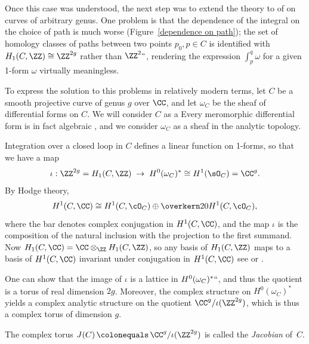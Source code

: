 Once this case was understood, the next step was to extend the theory
to
%
of 
%
on curves of arbitrary
genus. One problem is that the dependence of the integral on the
choice of path is much worse 
(Figure~\ref{dependence on path});
the set of homology classes of paths
between two points $p_0, p \in C$ is identified with $H_1(C,\ZZ) \cong
\ZZ^{2g}$ rather than $\ZZ^2` `$, rendering the expression $\int_p^q
\omega$ for a given 1-form $\omega$ virtually meaningless. 
{\meshing\par}

To express the solution to this problems in relatively modern terms,
let $C$ be a smooth projective curve of genus $g$ over $\CC$, and let
$\omega_{C}$ be the sheaf of differential forms on $C$. We will
consider $C$ as a 
%
%
Every meromorphic differential form is in fact algebraic
\cite{SerreGAGA}, and we consider $\omega_{C}$ as a sheaf in the analytic topology.

Integration 
%
over a closed loop in $C$ defines a linear function on 1-forms, so that we have a map
$$
\iota: \ZZ^{2g} = H_1(C,\ZZ) \; \to \;  H^0(\omega_C)^* \cong H^1(\sO_C) = \CC^{g}.
$$
By Hodge theory, 
% 
$$
H^1(C, \CC) \cong H^1(C, \cO_C) \oplus \overkern20{H^1(C, \cO_C)}
,
$$
where the bar denotes complex conjugation in $H^1(C, \CC)$, and the map $\iota$ is the composition of 
 the natural inclusion with the projection to the first summand.
 Now
$H_1(C,\CC) = \CC\otimes_\ZZ H_1(C,\ZZ)$, so any basis of $H_1(C,\ZZ)$ maps to a basis of 
$H^1(C, \CC)$ invariant under conjugation in $H^1(C, \CC)$\emdash 
see \cite{Voisin} or \cite[p.\,116]{Griffiths-Harris1978}. 

One can show that the image of $\iota$ is a 
%
lattice in $H^0(\omega_C)^*` `$, and thus the quotient
is a torus of real dimension $2g$. 
Moreover, the
complex structure on $H^0(\omega_C)^*$ yields a complex analytic structure on the quotient $\CC^{g}/\iota(\ZZ^{2g})$, which is thus a complex torus of  dimension $g$.  
%

\begin{definition}
\hskip-3pt
The complex torus $J(C) \,{\colonequals}\, \CC^{g}/\iota(\ZZ^{2g})$ 
%
%
is called the \emph{Jacobian} of~$C$.%
\unif
\end{definition}


